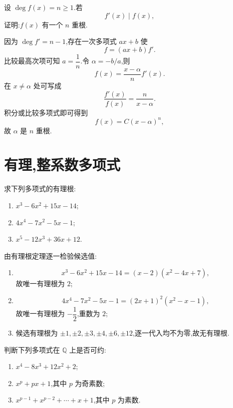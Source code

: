 \begin{example}
设 $\deg f(x)=n\ge1$.若
\[
  f'(x)\mid f(x),
\]
证明:$f(x)$ 有一个 $n$ 重根.
\end{example}
\exampleblank

\begin{solution}
因为 $\deg f'=n-1$,存在一次多项式 $ax+b$ 使
\[
  f=(ax+b)f'.
\]
比较最高次项可知 $a=\dfrac1n$.令 $\alpha=-b/a$,则
\[
  f(x)=\dfrac{x-\alpha}{n}f'(x).
\]
在 $x\ne\alpha$ 处可写成
\[
  \dfrac{f'(x)}{f(x)}=\dfrac{n}{x-\alpha}.
\]
积分或比较多项式即可得到
\[
  f(x)=C(x-\alpha)^n,
\]
故 $\alpha$ 是 $n$ 重根.
\end{solution}


\newpage

\section{有理,整系数多项式}

\begin{example}
求下列多项式的有理根:
\begin{enumerate}
  \item $x^3-6x^2+15x-14$;
  \item $4x^4-7x^2-5x-1$;
  \item $x^5-12x^3+36x+12$.
\end{enumerate}
\end{example}
\exampleblank

\begin{solution}
由有理根定理逐一检验候选值:
\begin{enumerate}
  \item
  \[
    x^3-6x^2+15x-14=(x-2)(x^2-4x+7),
  \]
  故唯一有理根为 $2$;
  \item
  \[
    4x^4-7x^2-5x-1=(2x+1)^2(x^2-x-1),
  \]
  故唯一有理根为 $-\dfrac12$,重数为 $2$;
  \item 候选有理根为 $\pm1,\pm2,\pm3,\pm4,\pm6,\pm12$,逐一代入均不为零,故无有理根.
\end{enumerate}
\end{solution}

\begin{example}
判断下列多项式在 $\mathbb{Q}$ 上是否可约:
\begin{enumerate}
  \item $x^4-8x^3+12x^2+2$;
  \item $x^p+px+1$,其中 $p$ 为奇素数;
  \item $x^{p-1}+x^{p-2}+\cdots+x+1$,其中 $p$ 为素数.
\end{enumerate}
\end{example}
\exampleblank

